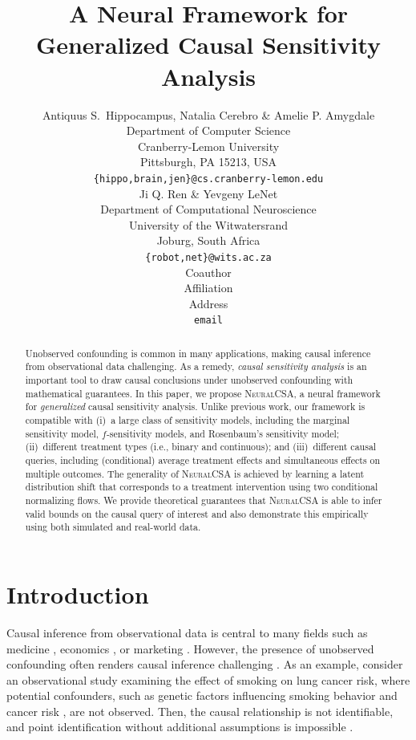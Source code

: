 \documentclass{article} %
\title{A Neural Framework for Generalized Causal Sensitivity Analysis}
\author{Antiquus S.~Hippocampus, Natalia Cerebro \& Amelie P. Amygdale \\
Department of Computer Science\\
Cranberry-Lemon University\\
Pittsburgh, PA 15213, USA \\
\texttt{\{hippo,brain,jen\}@cs.cranberry-lemon.edu} \\
\And
Ji Q. Ren \& Yevgeny LeNet \\
Department of Computational Neuroscience \\
University of the Witwatersrand \\
Joburg, South Africa \\
\texttt{\{robot,net\}@wits.ac.za} \\
\AND
Coauthor \\
Affiliation \\
Address \\
\texttt{email}
}
\newcommand{\frameworkname}{\textsc{NeuralCSA}\xspace}
\theoremstyle{definition}
\theoremstyle{plain}
\begin{document}
\maketitle

\begin{abstract}
Unobserved confounding is common in many applications, making causal inference from observational data challenging. As a remedy, \emph{causal sensitivity analysis} is an important tool to draw causal conclusions under unobserved confounding with mathematical guarantees. In this paper, we propose \frameworkname, a neural framework for \emph{generalized} causal sensitivity analysis. Unlike previous work, our framework is compatible with (i)~a large class of sensitivity models, including the marginal sensitivity model, $f$-sensitivity models, and Rosenbaum's sensitivity model; (ii)~different treatment types (i.e., binary and continuous); and (iii)~different causal queries, including (conditional) average treatment effects and simultaneous effects on multiple outcomes. The generality of \frameworkname is achieved by learning a latent distribution shift that corresponds to a treatment intervention using two conditional normalizing flows. We provide theoretical guarantees that \frameworkname is able to infer valid bounds on the causal query of interest and also demonstrate this empirically using both simulated and real-world data.
\end{abstract}


\section{Introduction}

Causal inference from observational data is central to many fields such as medicine \citep{Glass.2013}, economics \citep{Imbens.1994}, or marketing \citep{Varian.2016}. However, the presence of unobserved confounding often renders causal inference challenging \citep{DAmour.2019}. As an example, consider an observational study examining the effect of smoking on lung cancer risk, where potential confounders, such as genetic factors influencing smoking behavior and cancer risk \citep{Erzurumluoglu.2020}, are not observed. Then, the causal relationship is not identifiable, and point identification without additional assumptions is impossible \citep{Pearl.2009}.
\end{document}
